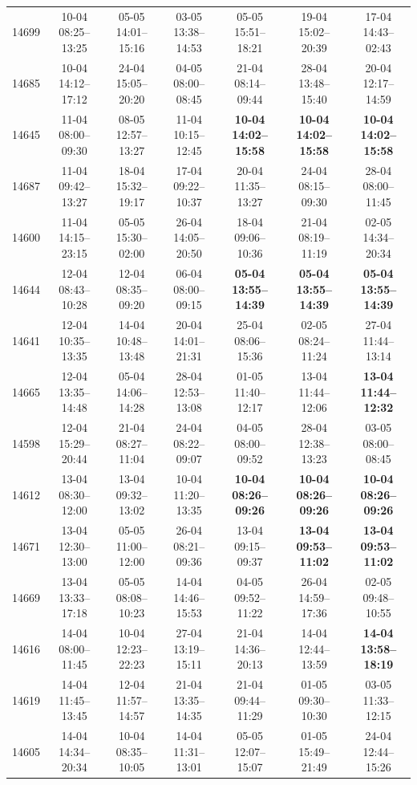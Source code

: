 \begin{table}[htbp]
\begin{tabular}{|r|c|c|c|c|c|c|}
14699 & 10-04 08:25--13:25 & 05-05 14:01--15:16 & 03-05 13:38--14:53 & 05-05 15:51--18:21 & 19-04 15:02--20:39 & 17-04 14:43--02:43 \\ 
14685 & 10-04 14:12--17:12 & 24-04 15:05--20:20 & 04-05 08:00--08:45 & 21-04 08:14--09:44 & 28-04 13:48--15:40 & 20-04 12:17--14:59 \\ 
14645 & 11-04 08:00--09:30 & 08-05 12:57--13:27 & 11-04 10:15--12:45 & \textbf{10-04 14:02--15:58} & \textbf{10-04 14:02--15:58} & \textbf{10-04 14:02--15:58} \\ 
14687 & 11-04 09:42--13:27 & 18-04 15:32--19:17 & 17-04 09:22--10:37 & 20-04 11:35--13:27 & 24-04 08:15--09:30 & 28-04 08:00--11:45 \\ 
14600 & 11-04 14:15--23:15 & 05-05 15:30--02:00 & 26-04 14:05--20:50 & 18-04 09:06--10:36 & 21-04 08:19--11:19 & 02-05 14:34--20:34 \\ 
14644 & 12-04 08:43--10:28 & 12-04 08:35--09:20 & 06-04 08:00--09:15 & \textbf{05-04 13:55--14:39} & \textbf{05-04 13:55--14:39} & \textbf{05-04 13:55--14:39} \\ 
14641 & 12-04 10:35--13:35 & 14-04 10:48--13:48 & 20-04 14:01--21:31 & 25-04 08:06--15:36 & 02-05 08:24--11:24 & 27-04 11:44--13:14 \\ 
14665 & 12-04 13:35--14:48 & 05-04 14:06--14:28 & 28-04 12:53--13:08 & 01-05 11:40--12:17 & 13-04 11:44--12:06 & \textbf{13-04 11:44--12:32} \\ 
14598 & 12-04 15:29--20:44 & 21-04 08:27--11:04 & 24-04 08:22--09:07 & 04-05 08:00--09:52 & 28-04 12:38--13:23 & 03-05 08:00--08:45 \\ 
14612 & 13-04 08:30--12:00 & 13-04 09:32--13:02 & 10-04 11:20--13:35 & \textbf{10-04 08:26--09:26} & \textbf{10-04 08:26--09:26} & \textbf{10-04 08:26--09:26} \\ 
14671 & 13-04 12:30--13:00 & 05-05 11:00--12:00 & 26-04 08:21--09:36 & 13-04 09:15--09:37 & \textbf{13-04 09:53--11:02} & \textbf{13-04 09:53--11:02} \\ 
14669 & 13-04 13:33--17:18 & 05-05 08:08--10:23 & 14-04 14:46--15:53 & 04-05 09:52--11:22 & 26-04 14:59--17:36 & 02-05 09:48--10:55 \\ 
14616 & 14-04 08:00--11:45 & 10-04 12:23--22:23 & 27-04 13:19--15:11 & 21-04 14:36--20:13 & 14-04 12:44--13:59 & \textbf{14-04 13:58--18:19} \\ 
14619 & 14-04 11:45--13:45 & 12-04 11:57--14:57 & 21-04 13:35--14:35 & 21-04 09:44--11:29 & 01-05 09:30--10:30 & 03-05 11:33--12:15 \\ 
14605 & 14-04 14:34--20:34 & 10-04 08:35--10:05 & 14-04 11:31--13:01 & 05-05 12:07--15:07 & 01-05 15:49--21:49 & 24-04 12:44--15:26 \\ 

\end{tabular}
\end{table}
